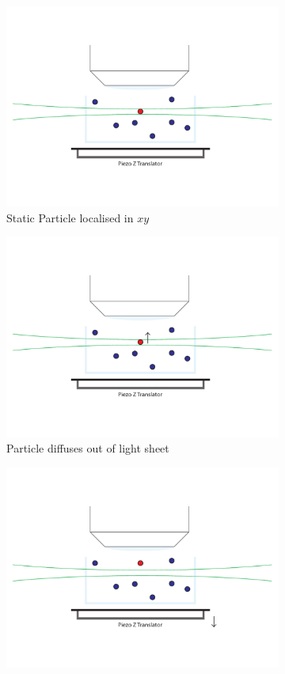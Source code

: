 \begin{figure}
	\centering
	\begin{subfigure}[b]{0.35\linewidth}
		\centering
		\includegraphics[width=0.8\linewidth]{Chapters/spt/Figs/PDF/tracking/1_piezo_track}
		\caption{Static Particle localised in \(xy\)}
		\label{fig:SPIMSPT1}
	\end{subfigure}
	\begin{subfigure}[b]{0.35\linewidth}
		\centering
		\includegraphics[width=0.8\linewidth]{Chapters/spt/Figs/PDF/tracking/2_piezo_track}
		\caption{Particle diffuses out of light sheet}
		\label{fig:SPIMSPT2}
	\end{subfigure}
	\begin{subfigure}[b]{0.35\linewidth}
		\centering
		\includegraphics[width=0.8\linewidth]{Chapters/spt/Figs/PDF/tracking/3_piezo_track}

\end{subfigure}
\end{figure}
